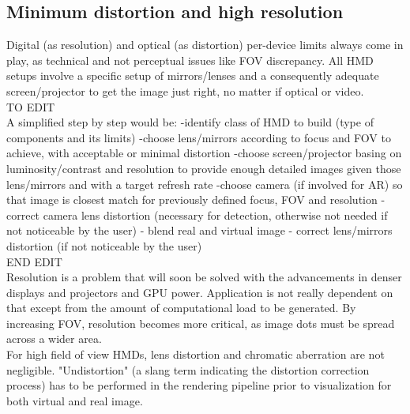 \subsection{Minimum distortion and high resolution}
Digital (as resolution) and optical (as distortion) per-device limits always come in play, as technical and not perceptual issues like FOV discrepancy. All HMD setups involve a specific setup of mirrors/lenses and a consequently adequate screen/projector to get the image just right, no matter if optical or video.\\
TO EDIT\\
A simplified step by step would be:
-identify class of HMD to build (type of components and its limits)
-choose lens/mirrors according to focus and FOV to achieve, with acceptable or minimal distortion
-choose screen/projector basing on luminosity/contrast and resolution to provide enough detailed images given those lens/mirrors and with a target refresh rate
-choose camera (if involved for AR) so that image is closest match for previously defined focus, FOV and resolution
- correct camera lens distortion (necessary for detection, otherwise not needed if not noticeable by the user)
- blend real and virtual image
- correct lens/mirrors distortion (if not noticeable by the user)\\
END EDIT\\
Resolution is a problem that will soon be solved with the advancements in denser displays and projectors and GPU power. Application is not really dependent on that except from the amount of computational load to be generated. By increasing FOV, resolution becomes more critical, as image dots must be spread across a wider area.\\
For high field of view HMDs, lens distortion and chromatic aberration are not negligible. "Undistortion" (a slang term indicating the distortion correction process) has to be performed in the rendering pipeline prior to visualization for both virtual and real image.

